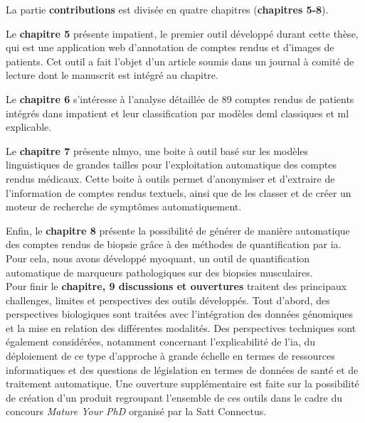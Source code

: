 La partie \textbf{contributions} est divisée en quatre chapitres (\textbf{chapitres 5-8}). 

Le \textbf{chapitre 5 }présente \gls{impatient}, le premier outil développé durant cette thèse, qui est une application web d'annotation de comptes rendus et d'images de patients. Cet outil a fait l'objet d'un article soumis dans un journal à comité de lecture dont le manuscrit est intégré au chapitre. 

Le \textbf{chapitre 6} s'intéresse à l'analyse détaillée de 89 comptes rendus de patients intégrés dans \gls{impatient} et leur classification par modèles de\gls{ml} classiques et \gls{ml} explicable.

Le \textbf{chapitre 7} présente \gls{nlmyo}, une boite à outil basé sur les modèles linguistiques de grandes tailles pour l'exploitation automatique des comptes rendus médicaux. Cette boite à outils permet d'anonymiser et d'extraire de l'information de comptes rendus textuels, ainsi que de les classer et de créer un moteur de recherche de symptômes automatiquement. 

Enfin, le \textbf{chapitre 8 }présente la possibilité de générer de manière automatique des comptes rendus de biopsie grâce à des méthodes de quantification par \gls{ia}. Pour cela, nous avons développé \gls{myoquant}, un outil de quantification automatique de marqueurs pathologiques sur des biopsies musculaires. \\


Pour finir le \textbf{chapitre, 9 discussions et ouvertures} traitent des principaux challenges, limites et perspectives des outils développés. Tout d'abord, des perspectives biologiques sont traitées avec l'intégration des données génomiques et la mise en relation des différentes modalités. Des perspectives techniques sont également considérées, notamment concernant l'explicabilité de l'\gls{ia}, du déploiement de ce type d'approche à grande échelle en termes de ressources informatiques et des questions de législation en termes de données de santé et de traitement automatique. Une ouverture supplémentaire est faite sur la possibilité de création d'un produit regroupant l'ensemble de ces outils dans le cadre du concours \textit{Mature Your PhD} organisé par la Satt Connectus.